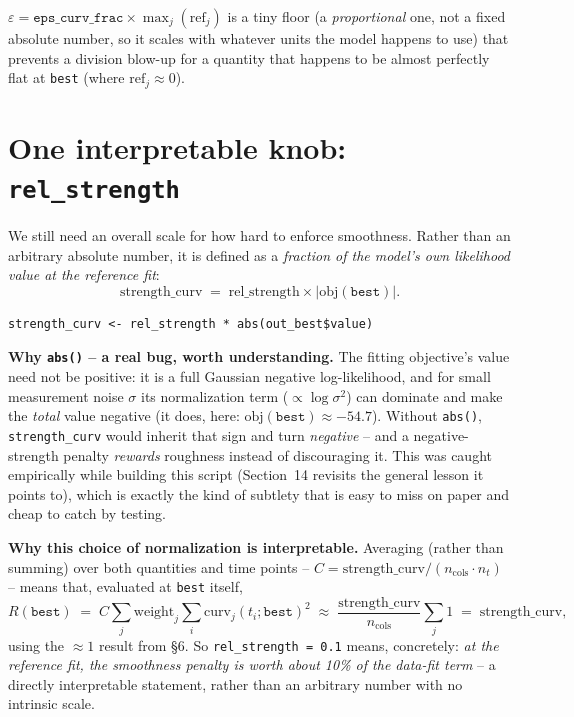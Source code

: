 \documentclass[11pt]{article}
\newcommand{\code}[1]{\texttt{#1}}
\begin{document}
$\varepsilon = \code{eps\_curv\_frac} \times \max_j(\mathrm{ref}_j)$ is a
tiny floor (a \emph{proportional} one, not a fixed absolute number, so it
scales with whatever units the model happens to use) that prevents a
division blow-up for a quantity that happens to be almost perfectly flat at
\code{best} (where $\mathrm{ref}_j \approx 0$).

\section{One interpretable knob: \code{rel\_strength}}

We still need an overall scale for how hard to enforce smoothness. Rather
than an arbitrary absolute number, it is defined as a \emph{fraction of the
model's own likelihood value at the reference fit}:
\[
  \mathrm{strength\_curv} \;=\; \mathrm{rel\_strength} \times \bigl|\mathrm{obj}(\code{best})\bigr|.
\]
\begin{lstlisting}
strength_curv <- rel_strength * abs(out_best$value)
\end{lstlisting}

\textbf{Why \code{abs()} -- a real bug, worth understanding.} The fitting
objective's value need not be positive: it is a full Gaussian negative
log-likelihood, and for small measurement noise $\sigma$ its normalization
term ($\propto \log\sigma^2$) can dominate and make the \emph{total} value
negative (it does, here: $\mathrm{obj}(\code{best})\approx-54.7$). Without
\code{abs()}, \code{strength\_curv} would inherit that sign and turn
\emph{negative} -- and a negative-strength penalty \emph{rewards} roughness
instead of discouraging it. This was caught empirically while building this
script (Section~14 revisits the general lesson it points to), which is
exactly the kind of subtlety that is easy to miss on paper and cheap to
catch by testing.

\textbf{Why this choice of normalization is interpretable.} Averaging
(rather than summing) over both quantities and time points --
$C = \mathrm{strength\_curv}/(n_{\mathrm{cols}}\cdot n_t)$ -- means that,
evaluated at \code{best} itself,
\[
  R(\code{best}) \;=\; C\sum_j \mathrm{weight}_j \sum_i \mathrm{curv}_j(t_i;\code{best})^2
  \;\approx\; \frac{\mathrm{strength\_curv}}{n_{\mathrm{cols}}}\sum_j 1
  \;=\; \mathrm{strength\_curv},
\]
using the $\approx 1$ result from \S6. So \code{rel\_strength = 0.1} means,
concretely: \emph{at the reference fit, the smoothness penalty is worth
about 10\% of the data-fit term} -- a directly interpretable statement,
rather than an arbitrary number with no intrinsic scale.
\end{document}
